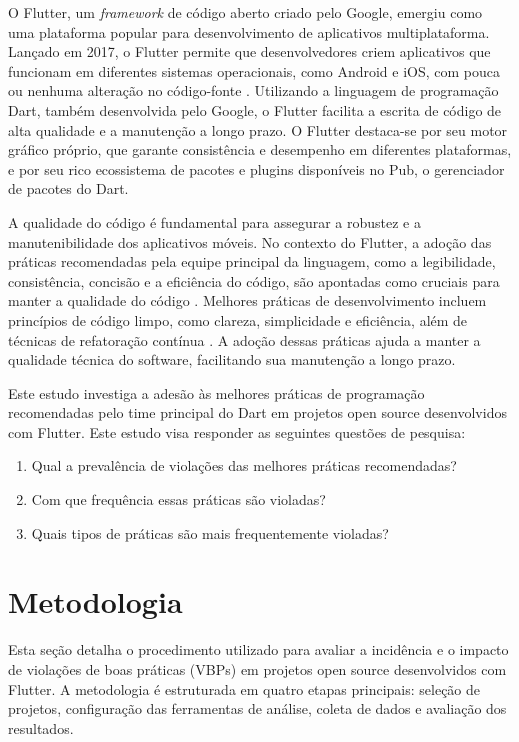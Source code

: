 \documentclass[12pt]{article}
\begin{document}
O Flutter, um \textit{framework} de código aberto criado pelo Google, emergiu como uma plataforma popular para desenvolvimento de aplicativos multiplataforma. Lançado em 2017, o Flutter permite que desenvolvedores criem aplicativos que funcionam em diferentes sistemas operacionais, como Android e iOS, com pouca ou nenhuma alteração no código-fonte \cite{flutter}. Utilizando a linguagem de programação Dart, também desenvolvida pelo Google, o Flutter facilita a escrita de código de alta qualidade e a manutenção a longo prazo. O Flutter destaca-se por seu motor gráfico próprio, que garante consistência e desempenho em diferentes plataformas, e por seu rico ecossistema de pacotes e plugins disponíveis no Pub, o gerenciador de pacotes do Dart.

A qualidade do código é fundamental para assegurar a robustez e a manutenibilidade dos aplicativos móveis. No contexto do Flutter, a adoção das práticas recomendadas pela equipe principal da linguagem, como a legibilidade, consistência, concisão e a eficiência do código, são apontadas como cruciais para manter a qualidade do código \cite{dartBestPractices}. Melhores práticas de desenvolvimento incluem princípios de código limpo, como clareza, simplicidade e eficiência, além de técnicas de refatoração contínua \cite{fowler1999refactoring}. A adoção dessas práticas ajuda a manter a qualidade técnica do software, facilitando sua manutenção a longo prazo.

Este estudo investiga a adesão às melhores práticas de programação recomendadas pelo time principal do Dart em projetos open source desenvolvidos com Flutter. Este estudo visa responder as seguintes questões de pesquisa:
\begin{enumerate}
\item Qual a prevalência de violações das melhores práticas recomendadas?
\item Com que frequência essas práticas são violadas?
\item Quais tipos de práticas são mais frequentemente violadas?
\end{enumerate}

\section{Metodologia}

Esta seção detalha o procedimento utilizado para avaliar a incidência e o impacto de violações de boas práticas (VBPs) em projetos open source desenvolvidos com Flutter. A metodologia é estruturada em quatro etapas principais: seleção de projetos, configuração das ferramentas de análise, coleta de dados e avaliação dos resultados.
\end{document}
